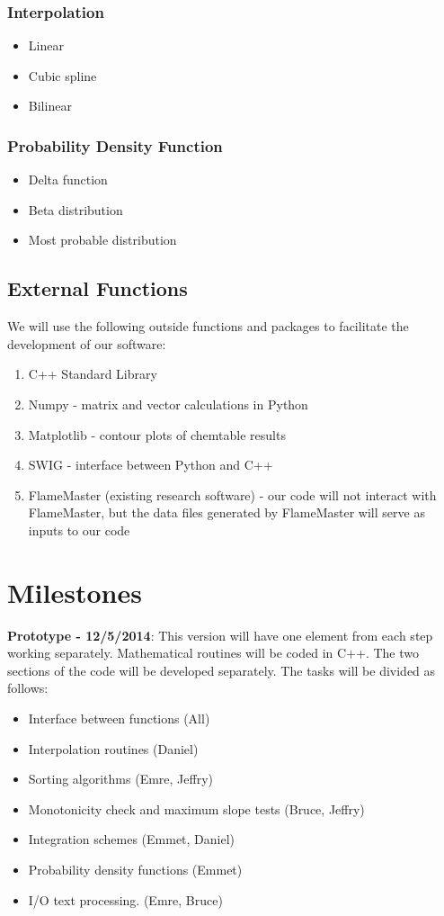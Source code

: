 \documentclass[11pt]{article}
\begin{document}
\subsubsection{Interpolation}
\begin{itemize}
\item Linear
\item Cubic spline
\item Bilinear
\end{itemize}

\subsubsection{Probability Density Function}
\begin{itemize}
\item Delta function
\item Beta distribution
\item Most probable distribution
\end{itemize}

\subsection{External Functions}

We will use the following outside functions and packages to facilitate
the development of our software:
\begin{enumerate}
\item C++ Standard Library
\item Numpy - matrix and vector calculations in Python
\item Matplotlib - contour plots of chemtable results
\item SWIG - interface between Python and C++
\item FlameMaster (existing research software) - our code will not
  interact with FlameMaster, but the data files generated by
  FlameMaster will serve as inputs to our code
\end{enumerate}

\section{Milestones}
\textbf{Prototype - 12/5/2014}: This version will have one element
from each step working separately. Mathematical routines will be coded
in C++. The two sections of the code will be developed separately. The
tasks will be divided as follows:
\begin{itemize}
\item Interface between functions (All)
\item Interpolation routines (Daniel)
\item Sorting algorithms (Emre, Jeffry)
\item Monotonicity check and maximum slope tests (Bruce, Jeffry)
\item Integration schemes (Emmet, Daniel)
\item Probability density functions (Emmet)
\item I/O text processing. (Emre, Bruce)
\end{itemize}
\end{document}

